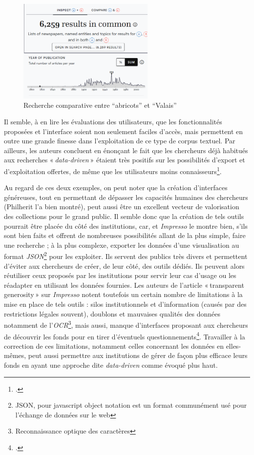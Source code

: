 \begin{figure}[h!]
	\centering
	\includegraphics[width=0.6\textwidth]{images/image17.png}
	\caption{Recherche comparative entre \enquote{abricots} et \enquote{Valais}}
	\label{fig:image17}
\end{figure}

Il semble, à en lire les évaluations des utilisateurs, que les fonctionnalités proposées et l’interface soient non seulement faciles d’accès, mais permettent en outre une grande finesse dans l’exploitation de ce type de corpus textuel. Par ailleurs, les auteurs concluent en énonçant le fait que les chercheurs déjà habitués aux recherches « \textit{data-driven} » étaient très positifs sur les possibilités d’export et d’exploitation offertes, de même que les utilisateurs moins connaisseurs\footcite[pp. 5-7]{during_transparent_2024}.

Au regard de ces deux exemples, on peut noter que la création d’interfaces généreuses, tout en permettant de dépasser les capacités humaines des chercheurs (Philherit l’a bien montré), peut aussi être un excellent vecteur de valorisation des collections pour le grand public. Il semble donc que la création de tels outils pourrait être placée du côté des institutions, car, et \textit{Impresso} le montre bien, s’ils sont bien faits et offrent de nombreuses possibilités allant de la plus simple, faire une recherche ; à la plus complexe, exporter les données d’une visualisation au format \textit{JSON}\footnote{JSON, pour javascript object notation est un format communément usé pour l'échange de données sur le web} pour les exploiter. Ils servent des publics très divers et permettent d’éviter aux chercheurs de créer, de leur côté, des outils dédiés. Ils peuvent alors réutiliser ceux proposés par les institutions pour servir leur cas d’usage ou les réadapter en utilisant les données fournies. Les auteurs de l’article « transparent generosity » sur \textit{Impresso} notent toutefois un certain nombre de limitations à la mise en place de tels outils : silos institutionnels et d’information (causés par des restrictions légales souvent), doublons et mauvaises qualités des données notamment de l’\textit{OCR}\footnote{Reconnaissance optique des caractères}, mais aussi, manque d’interfaces proposant aux chercheurs de découvrir les fonds pour en tirer d’éventuels questionnements\footcite[pp. 1-2]{during_transparent_2024}. Travailler à la correction de ces limitations, notamment celles concernant les données en elles-mêmes, peut aussi permettre aux institutions de gérer de façon plus efficace leurs fonds en ayant une approche dite \textit{data-driven} comme évoqué plus haut.

